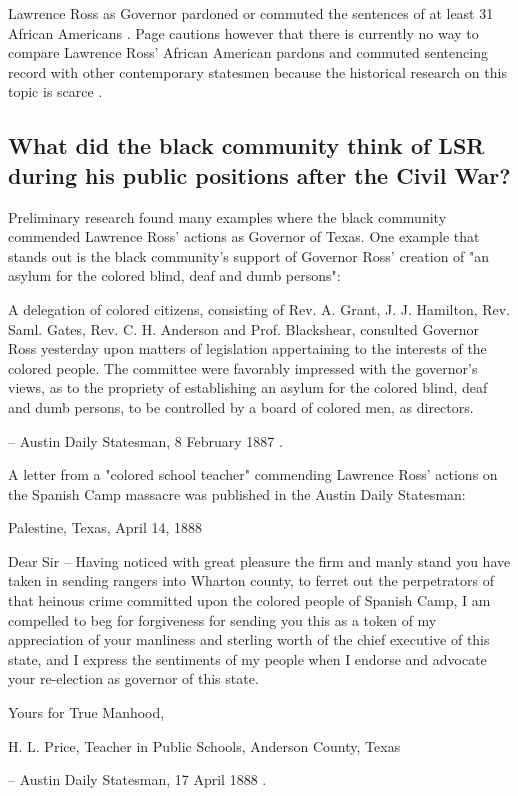 \documentclass[12pt]{article}
\begin{document}
Lawrence Ross as Governor pardoned or commuted the sentences of at least 31 African Americans \cite[pg. 146]{page}. Page cautions however that there is currently no way to compare Lawrence Ross' African American pardons and commuted sentencing record with other contemporary statesmen because the historical research on this topic is scarce \cite{page:email}.  

\newpage
\subsection{What did the black community think of LSR during his public positions after the Civil War?}
Preliminary research found many examples where the black community commended Lawrence Ross' actions as Governor of Texas. One example that stands out is the black community's support of Governor Ross' creation of "an asylum for the colored blind, deaf and dumb persons":

\begin{displayquote}
A delegation of colored citizens, consisting of Rev. A. Grant, J. J. Hamilton, Rev. Saml. Gates, Rev. C. H. Anderson and Prof. Blackshear, consulted Governor Ross yesterday upon matters of legislation appertaining to the interests of the colored people. The committee were favorably impressed with the governor’s views, as to the propriety of establishing an asylum for the colored blind, deaf and dumb persons, to be controlled by a board of colored men, as directors.

-- Austin Daily Statesman, 8 February 1887 \cite{astatesman:1887-02-08}.
\end{displayquote}

A letter from a "colored school teacher" commending Lawrence Ross' actions on the Spanish Camp massacre was published in the Austin Daily Statesman: 
\begin{displayquote}
Palestine, Texas, April 14, 1888

Dear Sir – Having noticed with great pleasure the firm and manly stand you have taken in sending rangers into Wharton county, to ferret out the perpetrators of that heinous crime committed upon the colored people of Spanish Camp, I am compelled to beg for forgiveness for sending you this as a token of my appreciation of your manliness and sterling worth of the chief executive of this state, and I express the sentiments of my people when I endorse and advocate your re-election as governor of this state.

Yours for True Manhood,

H. L. Price,
Teacher in Public Schools, Anderson County, Texas

-- Austin Daily Statesman, 17 April 1888 \cite{astatesman:1888-04-17}.
\end{displayquote}
\end{document}
